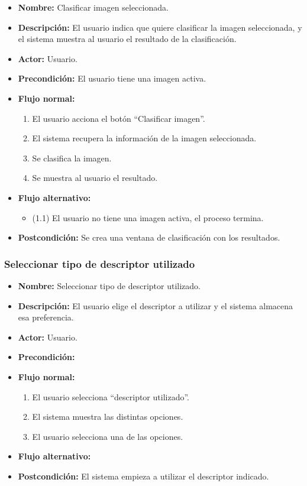 \begin{itemize}
\item \textbf{Nombre: }Clasificar imagen seleccionada.
\item \textbf{Descripción: } El usuario indica que quiere clasificar la imagen seleccionada, y el sistema muestra al usuario el resultado de la clasificación.
\item \textbf{Actor: }Usuario.
\item \textbf{Precondición: }El usuario tiene una imagen activa.
\item \textbf{Flujo normal: }
\begin{enumerate}
\item El usuario acciona el botón ``Clasificar imagen''.
\item El sistema recupera la información de la imagen seleccionada.
\item Se clasifica la imagen.
\item Se muestra al usuario el resultado.
\end{enumerate}
\item \textbf{Flujo alternativo:}
\begin{itemize}
\item (1.1) El usuario no tiene una imagen activa, el proceso termina.
\end{itemize}
\item \textbf{Postcondición: }Se crea una ventana de clasificación con los resultados.
\end{itemize}

\newpage

\subsubsection{Seleccionar tipo de descriptor utilizado}

\begin{itemize}
\item \textbf{Nombre: }Seleccionar tipo de descriptor utilizado.
\item \textbf{Descripción: }El usuario elige el descriptor a utilizar y el sistema almacena esa preferencia.
\item \textbf{Actor: }Usuario.
\item \textbf{Precondición: }
\item \textbf{Flujo normal: }
\begin{enumerate}
\item El usuario selecciona ``descriptor utilizado''.
\item El sistema muestra las distintas opciones.
\item El usuario selecciona una de las opciones.
\end{enumerate}
\item \textbf{Flujo alternativo:}
\item \textbf{Postcondición: }El sistema empieza a utilizar el descriptor indicado.
\end{itemize}

